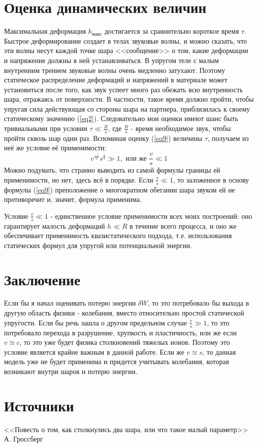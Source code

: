 \documentclass[a4paper]{article}
\begin{document}
\section{Оценка динамических величин}
Максимальная деформация $h_{макс}$ достигается за сравнительно короткое время $\tau$. Быстрое деформирование создает в телах звуковые волны, и можно сказать, что эти волны несут каждой точке шара <<сообщение>> о том, какие деформации и напряжение должны в ней устанавливаться. В упругом теле с малым внутренним трением звуковые волны очень медленно затухают. Поэтому статическое распределение деформаций и напряжений в материале может установиться после того, как звук успеет много раз обежать всю внутренность шара, отражаясь от поверхности. В частности, такое время должно пройти, чтобы упругая сила действующая со стороны шара на партнера, приблизилась к своему статическому значению (\ref{eq2}). Следовательно мои оценки имеют шанс быть тривиальными при условии $\tau \ll \frac{R}{s}$, где $\frac{R}{s}$ - время необходимое звук, чтобы пройти сквозь шар один раз. Вспоминая оценку (\ref{eq9}) величины $\tau$, получаем из неё же условие её применимости:
\begin{equation}
v^{\frac{-1}{5}}s^{\frac{1}{5}} \gg 1, \text{ или же } \frac{v}{s} \ll 1
\label{eq10}
\end{equation}
Можно подумать, что странно выводить из самой формулы границы ей применимости, но нет, здесь всё в порядке. Если $\frac{v}{s} \ll 1$, то заложенное в основу формулы (\ref{eq9}) преположение о многократном обегании шара звуком ей не противоречит и, значит, формула применима. 


Условие $\frac{v}{s} \ll 1$ - единственное условие применимости всех моих построений: оно гарантирует малость деформаций $h \ll R$ в течение всего процесса, и оно же обеспечивает применимость квазистатического подхода, т.е. использования статических формул для упругой или потенциальной энергии.

\section{Заключение}
Если бы я начал оценивать потерю энергии $\delta W$, то это потребовало бы выхода в другую область физики - колебания, вместо относительно простой статической упругости. Если бы речь зашла о другом предельном случае $\frac{v}{s} \gg 1$, то это потребовало перехода в разрушение, хрупкость и пластичность, или же если $v \cong c$, то это уже будет физика столкновений тяжелых ионов. Поэтому это условие является крайне важным в данной работе. Если же $v \cong s$, то данная модель уже не будет применима и придется учитывать колебания, которая возникают внутри шаров и потерю энергии. 

\section{Источники}
<<Повесть о том, как столкнулись два шара, или что такое малый параметр>> А. Гроссберг
\end{document}
